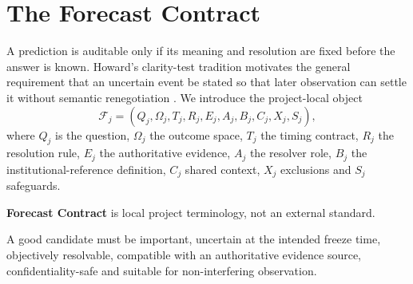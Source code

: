 \section{The Forecast Contract}
A prediction is auditable only if its meaning and resolution are fixed before the answer is known. Howard's clarity-test tradition motivates the general requirement that an uncertain event be stated so that later observation can settle it without semantic renegotiation \citep{howard1988}. We introduce the project-local object
\[
\mathcal F_j=(Q_j,\Omega_j,T_j,R_j,E_j,A_j,B_j,C_j,X_j,S_j),
\]
where $Q_j$ is the question, $\Omega_j$ the outcome space, $T_j$ the timing contract, $R_j$ the resolution rule, $E_j$ the authoritative evidence, $A_j$ the resolver role, $B_j$ the institutional-reference definition, $C_j$ shared context, $X_j$ exclusions and $S_j$ safeguards.

\textbf{Forecast Contract} is local project terminology, not an external standard.

A good candidate must be important, uncertain at the intended freeze time, objectively resolvable, compatible with an authoritative evidence source, confidentiality-safe and suitable for non-interfering observation.
